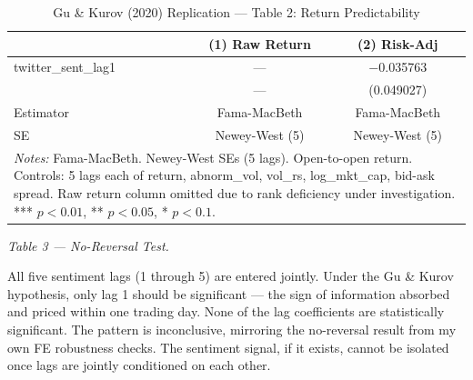 \documentclass[12pt]{article}
\begin{document}
\begin{table}[htbp]
\centering
\caption{Gu \& Kurov (2020) Replication --- Table 2: Return Predictability}
\label{tab:gk_t2}
\begin{tabular}{lcc}
\hline\hline
 & (1) Raw Return & (2) Risk-Adj \\
\hline
twitter\_sent\_lag1 & --- & $-$0.035763 \\
 & --- & (0.049027) \\
\hline
Estimator & Fama-MacBeth & Fama-MacBeth \\
SE & Newey-West (5) & Newey-West (5) \\
\hline\hline
\multicolumn{3}{p{0.9\linewidth}}{\footnotesize \textit{Notes:} Fama-MacBeth. Newey-West SEs (5 lags). Open-to-open return. Controls: 5 lags each of return, abnorm\_vol, vol\_rs, log\_mkt\_cap, bid-ask spread. Raw return column omitted due to rank deficiency under investigation. *** $p<0.01$, ** $p<0.05$, * $p<0.1$.}
\end{tabular}
\end{table}

\medskip

\noindent\textit{Table 3 --- No-Reversal Test.}

All five sentiment lags (1 through 5) are entered jointly. Under the Gu \& Kurov hypothesis, only lag 1 should be significant --- the sign of information absorbed and priced within one trading day. None of the lag coefficients are statistically significant. The pattern is inconclusive, mirroring the no-reversal result from my own FE robustness checks. The sentiment signal, if it exists, cannot be isolated once lags are jointly conditioned on each other.
\end{document}
